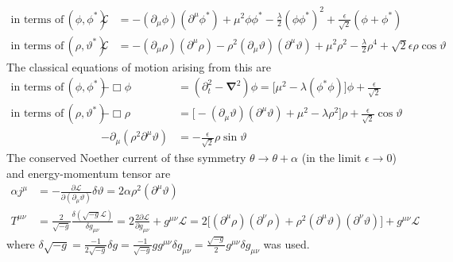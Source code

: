 \begin{subequations}
    \begin{align}
        \text{in terms of}\,(\phi,\phi^*)      &  & \mathscr{L} & =-(\partial_\mu\phi)(\partial^\mu\phi^*)+\mu^2\phi\phi^*-\frac{\lambda}{2}(\phi\phi^*)^2+\frac{\epsilon}{\sqrt{2}}(\phi+\phi^*)                                   \\
        \text{in terms of}\,(\rho,\vartheta^*) &  & \mathscr{L} & =-(\partial_\mu\rho)(\partial^\mu\rho)-\rho^2(\partial_\mu\vartheta)(\partial^\mu\vartheta)+\mu^2\rho^2-\frac{\lambda}{2}\rho^4+\sqrt{2}\epsilon\rho\cos\vartheta
    \end{align}
\end{subequations}
The classical equations of motion arising from this are
\begin{subequations}
    \begin{align}
        \text{in terms of}\,(\phi,\phi^*)      &                                                                                                                           & -\Box\phi                                  & =(\partial_t^2-\mathbf{\nabla}^2)\phi=\big[\mu^2-\lambda(\phi^*\phi)\big]\phi+\frac{\epsilon}{\sqrt{2}} \\
        \text{in terms of}\,(\rho,\vartheta^*) &                                                                                                                           &
        -\Box\rho                              & =\big[-(\partial_\mu\vartheta)(\partial^\mu\vartheta)+\mu^2-\lambda\rho^2\big]\rho+\frac{\epsilon}{\sqrt{2}}\cos\vartheta                                                                                                                                                        \\
                                               &                                                                                                                           & -\partial_\mu(\rho^2\partial^\mu\vartheta) & =-\frac{\epsilon}{\sqrt{2}}\rho\sin\vartheta
    \end{align}
\end{subequations}
The conserved Noether current of thse symmetry $\theta\to\theta+\alpha$ (in the limit $\epsilon\to 0$) and energy-momentum tensor are
\begin{subequations}
    \begin{align}
        \alpha j^\mu & =-\frac{\partial\mathscr{L}}{\partial(\partial_\mu\vartheta)}\delta\vartheta=2\alpha\rho^2(\partial^\mu\vartheta)                                                                                                                                                             \\
        T^{\mu\nu}   & =\frac{2}{\sqrt{-g}}\frac{\delta(\sqrt{-g}\mathscr{L})}{\delta g_{\mu\nu}}=2\frac{2\partial\mathscr{L}}{\partial g_{\mu\nu}}+g^{\mu\nu}\mathscr{L}=2\big[(\partial^\mu\rho)(\partial^\nu\rho)+\rho^2(\partial^\mu\vartheta)(\partial^\nu\vartheta)\big]+g^{\mu\nu}\mathscr{L}
    \end{align}
\end{subequations}
where $\delta\sqrt{-g}=\frac{-1}{2\sqrt{-g}}\delta g=\frac{-1}{\sqrt{-g}}gg^{\mu\nu}\delta g_{\mu\nu}=\frac{\sqrt{-g}}{2}g^{\mu\nu}\delta g_{\mu\nu}$ was used.

